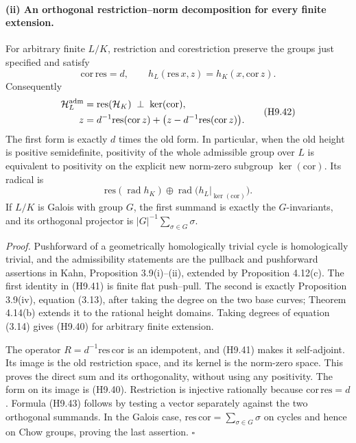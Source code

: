 \documentclass[11pt,a4paper]{article}
\begin{document}
\paragraph{(ii) An orthogonal restriction--norm decomposition for every finite extension.}
For arbitrary finite $L/K$, restriction and corestriction preserve the
groups just specified and satisfy
\[
 \mathrm{cor}\,\mathrm{res}=d,
 \qquad
 h_L(\mathrm{res}\,x,z)=h_K(x,\mathrm{cor}\,z).               \tag{H9.41}
\]
Consequently
\[
 \begin{split}
 \mathcal H_L^{\rm adm}
   &=\mathrm{res}(\mathcal H_K)\ \mathbin{\perp}\
                           \ker(\mathrm{cor}),\\
 z&=d^{-1}\mathrm{res}(\mathrm{cor}\,z)
       +\bigl(z-d^{-1}\mathrm{res}(\mathrm{cor}\,z)\bigr).
 \end{split}                                                \tag{H9.42}
\]
The first form is exactly $d$ times the old form. In particular, when
the old height is positive semidefinite, positivity of the whole
admissible group over $L$ is equivalent to positivity on the explicit
new norm-zero subgroup $\ker(\mathrm{cor})$. Its radical is
\[
 \mathrm{res}(\operatorname{rad}h_K)
       \oplus\operatorname{rad}
          \bigl(h_L|_{\ker(\mathrm{cor})}\bigr).              \tag{H9.43}
\]
If $L/K$ is Galois with group $G$, the first summand is exactly the
$G$-invariants, and its orthogonal projector is
$|G|^{-1}\sum_{\sigma\in G}\sigma$.

\emph{Proof.} Pushforward of a geometrically homologically trivial cycle
is homologically trivial, and the admissibility statements are the
pullback and pushforward assertions in Kahn, Proposition 3.9(i)--(ii),
extended by Proposition 4.12(c). The first identity in (H9.41) is
finite flat push--pull. The second is exactly Proposition 3.9(iv),
equation (3.13), after taking the degree on the two base curves;
Theorem 4.14(b) extends it to the rational height domains. Taking
degrees of equation (3.14) gives (H9.40) for arbitrary finite extension.

The operator $R=d^{-1}\mathrm{res}\,\mathrm{cor}$ is an idempotent,
and (H9.41) makes it self-adjoint. Its image is the old restriction
space, and its kernel is the norm-zero space. This proves the direct
sum and its orthogonality, without using any positivity. The form on
its image is (H9.40). Restriction is injective rationally because
$\mathrm{cor}\,\mathrm{res}=d$. Formula (H9.43) follows by testing a
vector separately against the two orthogonal summands. In the Galois
case, $\mathrm{res}\,\mathrm{cor}=\sum_{\sigma\in G}\sigma$ on
cycles and hence on Chow groups, proving the last assertion.
\hfill$\square$
\end{document}
